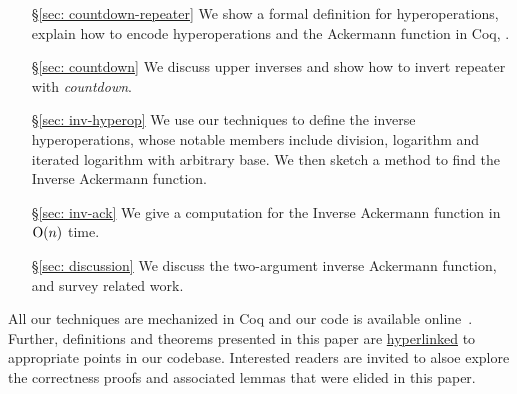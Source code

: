 \begin{itemize}
	\item[\S\ref{sec: countdown-repeater}] We show a formal definition for hyperoperations, explain how to encode hyperoperations and the Ackermann function in Coq, .
	\item[\S\ref{sec: countdown}] We discuss upper inverses and show how to invert repeater with \emph{countdown}.
	\item[\S\ref{sec: inv-hyperop}] We use our techniques to define the inverse hyperoperations, whose notable members include division, logarithm and iterated logarithm with arbitrary base. We then sketch a method to find the Inverse Ackermann function.
	\item[\S\ref{sec: inv-ack}] We give a computation for the Inverse Ackermann function in $\text{O}(n)$ time.
	\item[\S\ref{sec: discussion}] We discuss the two-argument inverse Ackermann function,  and survey related work.
\end{itemize}
All our techniques are mechanized in Coq and our code is available 
online~\cite{inv-ack}. Further, definitions and theorems 
presented in this paper are \href{https://github.com/inv-ack/inv-ack}{hyperlinked} 
to appropriate points in our codebase. Interested readers are invited to alsoe
explore the correctness proofs and associated lemmas that were elided in this paper.

